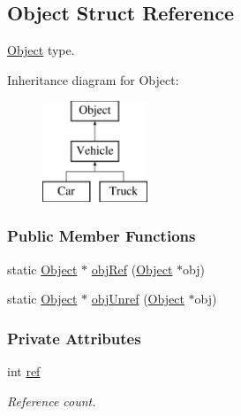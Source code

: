 \hypertarget{struct_object}{}\subsection{Object Struct Reference}
\label{struct_object}


\hyperlink{struct_object}{Object} type.  


Inheritance diagram for Object\+:\begin{figure}[H]
\begin{center}
\leavevmode
\includegraphics[height=3.000000cm]{struct_object}
\end{center}
\end{figure}
\subsubsection*{Public Member Functions}
\begin{DoxyCompactItemize}
\item 
static \hyperlink{struct_object}{Object} $\ast$ \hyperlink{struct_object_a71225073d06a793b9a6ea9263ed37b12}{obj\+Ref} (\hyperlink{struct_object}{Object} $\ast$obj)
\item 
static \hyperlink{struct_object}{Object} $\ast$ \hyperlink{struct_object_a924ee0cecc906d148022b3f0d6325cfb}{obj\+Unref} (\hyperlink{struct_object}{Object} $\ast$obj)
\end{DoxyCompactItemize}
\subsubsection*{Private Attributes}
\begin{DoxyCompactItemize}
\item 
\hypertarget{struct_object_a1b6037fba835e83243ababce426ff9af}{}\label{struct_object_a1b6037fba835e83243ababce426ff9af} 
int \hyperlink{struct_object_a1b6037fba835e83243ababce426ff9af}{ref}
\begin{DoxyCompactList}\small\item\em Reference count. \end{DoxyCompactList}\end{DoxyCompactItemize}


